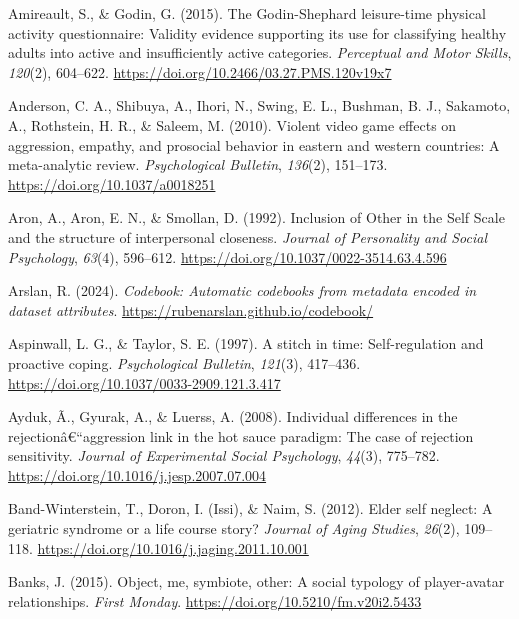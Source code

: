 \documentclass[
]{udthesis}
\newlength{\cslhangindent}
\newenvironment{CSLReferences}[2] %
 {\begin{list}{}{%
  \setlength{\itemindent}{0pt}
  \setlength{\leftmargin}{0pt}
  \setlength{\parsep}{0pt}
  \ifodd #1
   \setlength{\leftmargin}{\cslhangindent}
   \setlength{\itemindent}{-1\cslhangindent}
  \fi
  \setlength{\itemsep}{#2\baselineskip}}}
 {\end{list}}
\begin{document}
\begin{CSLReferences}{1}{0}
Amireault, S., \& Godin, G. (2015). The {Godin}-{Shephard} leisure-time physical activity questionnaire: Validity evidence supporting its use for classifying healthy adults into active and insufficiently active categories. \emph{Perceptual and Motor Skills}, \emph{120}(2), 604--622. \url{https://doi.org/10.2466/03.27.PMS.120v19x7}

Anderson, C. A., Shibuya, A., Ihori, N., Swing, E. L., Bushman, B. J., Sakamoto, A., Rothstein, H. R., \& Saleem, M. (2010). Violent video game effects on aggression, empathy, and prosocial behavior in eastern and western countries: A meta-analytic review. \emph{Psychological Bulletin}, \emph{136}(2), 151--173. \url{https://doi.org/10.1037/a0018251}

Aron, A., Aron, E. N., \& Smollan, D. (1992). Inclusion of {Other} in the {Self Scale} and the structure of interpersonal closeness. \emph{Journal of Personality and Social Psychology}, \emph{63}(4), 596--612. \url{https://doi.org/10.1037/0022-3514.63.4.596}

Arslan, R. (2024). \emph{Codebook: Automatic codebooks from metadata encoded in dataset attributes}. \url{https://rubenarslan.github.io/codebook/}

Aspinwall, L. G., \& Taylor, S. E. (1997). A stitch in time: {Self}-regulation and proactive coping. \emph{Psychological Bulletin}, \emph{121}(3), 417--436. \url{https://doi.org/10.1037/0033-2909.121.3.417}

Ayduk, Ã., Gyurak, A., \& Luerss, A. (2008). Individual differences in the rejectionâ€``aggression link in the hot sauce paradigm: {The} case of rejection sensitivity. \emph{Journal of Experimental Social Psychology}, \emph{44}(3), 775--782. \url{https://doi.org/10.1016/j.jesp.2007.07.004}

Band-Winterstein, T., Doron, I. (Issi), \& Naim, S. (2012). Elder self neglect: {A} geriatric syndrome or a life course story? \emph{Journal of Aging Studies}, \emph{26}(2), 109--118. \url{https://doi.org/10.1016/j.jaging.2011.10.001}

Banks, J. (2015). Object, me, symbiote, other: A social typology of player-avatar relationships. \emph{First Monday}. \url{https://doi.org/10.5210/fm.v20i2.5433}


\end{CSLReferences}
\end{document}
